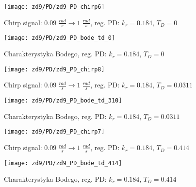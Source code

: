 \documentclass[11 pt]{article}
\begin{document}
\newpage

\begin{figure}[h!]
	\centerline{
	\texttt{[image: zd9/PD/zd9\_PD\_chirp6]}
	}
	\caption{Chirp signal: $0.09 \; \frac{rad}{s} \rightarrow 1 \; \frac{rad}{s}$, reg. PD: $k_r = 0.184$, $T_D = 0$}
	\label{fig:pd_chirp_td_start}
\end{figure}

\begin{figure}[h!]
	\centerline{
	\texttt{[image: zd9/PD/zd9\_PD\_bode\_td\_0]}
	}
	\caption{Charakterystyka Bodego, reg. PD: $k_r = 0.184$, $T_D = 0$}
\end{figure}

\begin{figure}[h!]
	\centerline{
	\texttt{[image: zd9/PD/zd9\_PD\_chirp8]}
	}
	\caption{Chirp signal: $0.09 \; \frac{rad}{s} \rightarrow 1 \; \frac{rad}{s}$, reg. PD: $k_r = 0.184$, $T_D = 0.0311$}
\end{figure}

\newpage

\begin{figure}[h!]
	\centerline{
	\texttt{[image: zd9/PD/zd9\_PD\_bode\_td\_310]}
	}
	\caption{Charakterystyka Bodego, reg. PD: $k_r = 0.184$, $T_D = 0.0311$}
\end{figure}

\begin{figure}[h!]
	\centerline{
	\texttt{[image: zd9/PD/zd9\_PD\_chirp7]}
	}
	\caption{Chirp signal: $0.09 \; \frac{rad}{s} \rightarrow 1 \; \frac{rad}{s}$, reg. PD: $k_r = 0.184$, $T_D = 0.414$}
\end{figure}

\begin{figure}[h!]
	\centerline{
	\texttt{[image: zd9/PD/zd9\_PD\_bode\_td\_414]}
	}
	\caption{Charakterystyka Bodego, reg. PD: $k_r = 0.184$, $T_D = 0.414$}
	\label{fig:pd_chirp_td_end}
\end{figure}

\newpage
\end{document}
